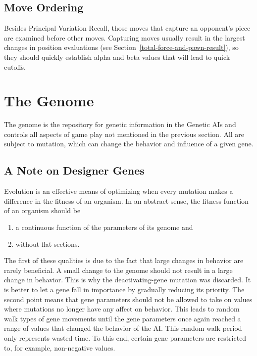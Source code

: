 \documentclass[letterpaper]{article}
\renewcommand{\_}{\allowbreak\textunderscore\allowbreak}
\begin{document}
\subsection{Move Ordering}

Besides Principal Variation Recall, those moves that capture an opponent's piece are examined before other moves. Capturing moves usually result in the largest changes in position evaluations (see Section~\ref{total-force-and-pawn-result}), so they should quickly establish alpha and beta values that will lead to quick cutoffs.

\section{The Genome}\label{gene-section}

The genome is the repository for genetic information in the Genetic AIs and controls all aspects of game play not mentioned in the previous section. All are subject to mutation, which can change the behavior and influence of a given gene.

\subsection{A Note on Designer Genes}

Evolution is an effective means of optimizing when every mutation makes a difference in the fitness of an organism. In an abstract sense, the fitness function of an organism should be
\begin{enumerate}
	\item a continuous function of the parameters of its genome and
	\item without flat sections.
\end{enumerate}
The first of these qualities is due to the fact that large changes in behavior are rarely beneficial. A small change to the genome should not result in a large change in behavior. This is why the deactivating-gene mutation was discarded. It is better to let a gene fall in importance by gradually reducing its priority. The second point means that gene parameters should not be allowed to take on values where mutations no longer have any affect on behavior. This leads to random walk types of gene movements until the gene parameters once again reached a range of values that changed the behavior of the AI\@. This random walk period only represents wasted time. To this end, certain gene parameters are restricted to, for example, non-negative values.
\end{document}
